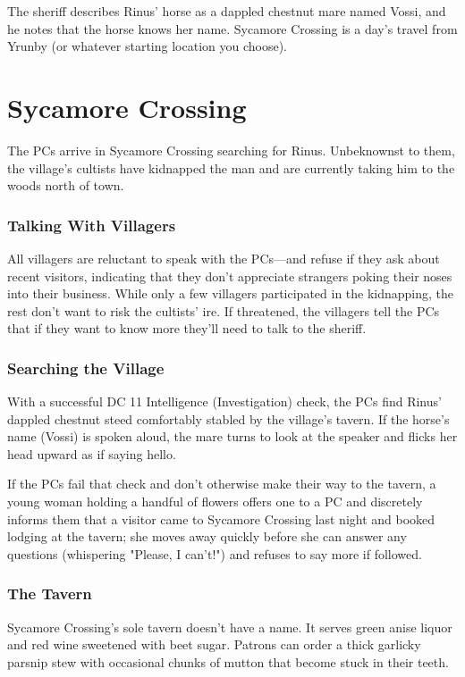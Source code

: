 \documentclass[10pt,a4paper,twoside,bg=print,twocolumn,openany,nodeprecatedcode]{dndbook}
\begin{document}
The sheriff describes Rinus' horse as a dappled chestnut mare named Vossi, and he notes that the horse knows her name. Sycamore Crossing is a day's travel from Yrunby (or whatever starting location you choose).

\section{Sycamore Crossing}
The PCs arrive in Sycamore Crossing searching for Rinus. Unbeknownst to them, the village's cultists have kidnapped the man and are currently taking him to the woods north of town.

\subsubsection{Talking With Villagers}
All villagers are reluctant to speak with the PCs—and refuse if they ask about recent visitors, indicating that they don't appreciate strangers poking their noses into their business. While only a few villagers participated in the kidnapping, the rest don't want to risk the cultists' ire. If threatened, the villagers tell the PCs that if they want to know more they'll need to talk to the sheriff.

\subsubsection{Searching the Village}
With a successful DC 11 Intelligence (Investigation) check, the PCs find Rinus' dappled chestnut steed comfortably stabled by the village's tavern. If the horse's name (Vossi) is spoken aloud, the mare turns to look at the speaker and flicks her head upward as if saying hello.

If the PCs fail that check and don't otherwise make their way to the tavern, a young woman holding a handful of flowers offers one to a PC and discretely informs them that a visitor came to Sycamore Crossing last night and booked lodging at the tavern; she moves away quickly before she can answer any questions (whispering "Please, I can't!") and refuses to say more if followed.

\subsubsection{The Tavern}
Sycamore Crossing's sole tavern doesn't have a name. It serves green anise liquor and red wine sweetened with beet sugar. Patrons can order a thick garlicky parsnip stew with occasional chunks of mutton that become stuck in their teeth.
\end{document}
